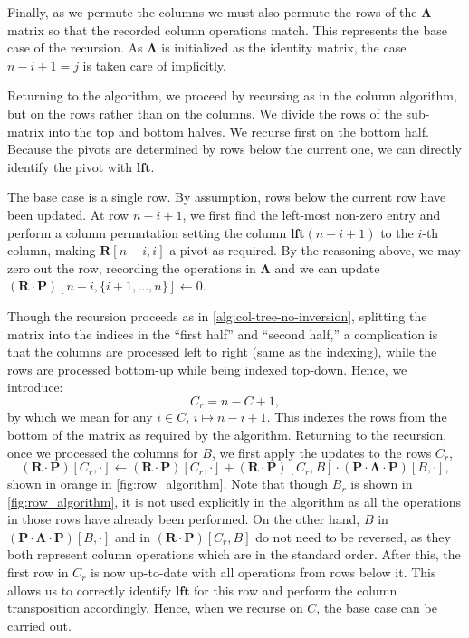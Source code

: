 \documentclass[10pt,a4paper]{article}
\newtheorem{remark}[theorem]{Remark}
\newcommand{\mat}[1]{\mathbf{#1}}
\newcommand{\lft}{\mathbf{lft}}
\newcommand{\Remark}[1]{\textcolor{blue}{[#1]}}
\begin{document}


Finally, as we permute the columns we must also permute the rows of the $\mat{\Lambda}$  matrix so that the recorded column operations match. This represents the base case of the recursion.   As $\mat{\Lambda}$ is initialized as the identity matrix,  the case $n-i+1=j$ is taken care of implicitly.


Returning to the algorithm, we proceed by recursing as in the  column algorithm, but on the rows rather than on the columns. We divide the rows of the sub-matrix into the top and bottom halves. We recurse first on the bottom half. Because the pivots are determined by rows below the current one, we can directly identify the pivot with $\lft $. 

The base case is a single row. By assumption, rows below the current row have been updated. At row $n-i+1$, we first find the left-most non-zero entry and perform a column permutation setting the column $\lft (n-i+1)$ to the $i$-th column, making $\mat{R}[n-i,i]$ a pivot as required. By the reasoning above, we may zero out the row, recording the operations in $\mat{\Lambda}$ and we can update $(\mat{R} \cdot \mat{P})[n-i,\{i+1, \ldots,n\}] \gets 0$.




Though the recursion proceeds as in \cref{alg:col-tree-no-inversion}, splitting the matrix into the indices in the ``first half'' and ``second half,'' a complication is that the columns are processed left to right (same as the indexing), while the rows are processed bottom-up while being indexed top-down. Hence, we introduce:
\[C_r = n-C+1,\]
by which we mean for any $i\in C$, $i \mapsto n-i+1$. This indexes the rows from the bottom of the matrix as required by the algorithm. %
Returning to the recursion, once we processed the columns for $B$, 
%
we first apply the updates to the rows $C_r$, 
\[
    (\mat{R} \cdot \mat{P})[C_r,\cdot ] \gets (\mat{R} \cdot \mat{P})[C_r, \cdot ]
    +  (\mat{R} \cdot \mat{P})[C_r,B] \cdot (\mat{P} \cdot \mat{\Lambda} \cdot \mat{P})[B,\cdot],
\]
shown in orange in \cref{fig:row_algorithm}. Note that though $B_r$ is shown in \cref{fig:row_algorithm}, it is not used explicitly in the algorithm as all the operations in those rows have already been performed. On the other hand, $B$ in $(\mat{P} \cdot \mat{\Lambda} \cdot \mat{P})[B,\cdot]$ and in $(\mat{R} \cdot \mat{P})[C_r,B]$ do not need to be reversed, as they both represent column operations which are in the standard order.  After this, the first row in $C_r$ is now up-to-date with all operations from rows below it. This allows us to  correctly identify $\lft $ for this row and  perform the column transposition accordingly. Hence, when we recurse on $C$, the base case can be carried out. 
\end{document}
